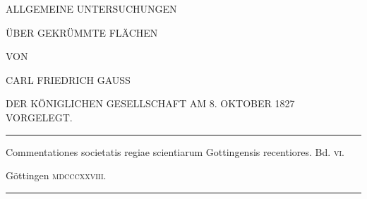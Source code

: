 \clearpage
{}
\thispagestyle{empty}
\vspace*{.5in}
\begin{center}
{\large ALLGEMEINE UNTERSUCHUNGEN}\par\bigskip
{\Large ÜBER GEKRÜMMTE FLÄCHEN}\par\vspace{50pt}
VON\par\vspace{55pt}
{\large CARL FRIEDRICH GAUSS}\par\vspace{45pt}
{\small DER KÖNIGLICHEN GESELLSCHAFT AM 8. OKTOBER 1827 VORGELEGT.}
\end{center}
\vfill
\begin{center}
\rule{.8\linewidth}{.3pt}\par\smallskip
\small Commentationes societatis regiae scientiarum Gottingensis recentiores. Bd. \textsc{vi}.\par
Göttingen \textsc{mdcccxxviii}.\par\smallskip
\rule{.8\linewidth}{.3pt}
\end{center}
\clearpage
